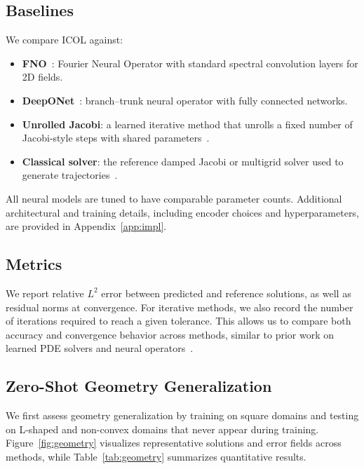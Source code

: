 \documentclass{article}
\begin{document}
\subsection{Baselines}

We compare ICOL against:
\begin{itemize}
\item \textbf{FNO}~\cite{li2020fourier}: Fourier Neural Operator with standard spectral convolution layers for 2D fields.
\item \textbf{DeepONet}~\cite{lu2021deeponet}: branch--trunk neural operator with fully connected networks.
\item \textbf{Unrolled Jacobi}: a learned iterative method that unrolls a fixed number of Jacobi-style steps with shared parameters~\cite{li2020neuralpde,hoyer2023learning}.
\item \textbf{Classical solver}: the reference damped Jacobi or multigrid solver used to generate trajectories~\cite{briggs2000multigrid,saad2003iterative}.
\end{itemize}
All neural models are tuned to have comparable parameter counts. Additional architectural and training details, including encoder choices and hyperparameters, are provided in Appendix~\ref{app:impl}.

\subsection{Metrics}

We report relative $L^2$ error between predicted and reference solutions, as well as residual norms at convergence. For iterative methods, we also record the number of iterations required to reach a given tolerance. This allows us to compare both accuracy and convergence behavior across methods, similar to prior work on learned PDE solvers and neural operators~\cite{brandstetter2022message,bar2021learning,finzi2021probabilistic}.

\subsection{Zero-Shot Geometry Generalization}

We first assess geometry generalization by training on square domains and testing on L-shaped and non-convex domains that never appear during training. Figure~\ref{fig:geometry} visualizes representative solutions and error fields across methods, while Table~\ref{tab:geometry} summarizes quantitative results.
\end{document}
